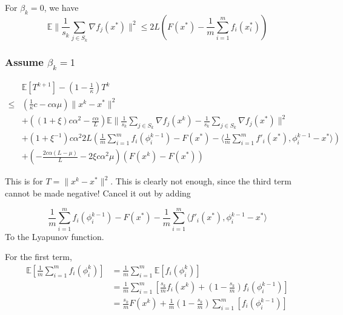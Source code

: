 \documentclass[12pt]{article}
\begin{document}
		For $\beta_k=0$, we have 
		\begin{equation}
			\mathbb{E} \| \frac{1 }{s_k} \sum_{j \in S_k}  \nabla f_j(x^*) \|^2 \leq 2L(  F(x^*)  -\frac{1}{m}\sum_{i =1}^{m}  f_i(x_i^*))
		\end{equation}
		
		\subsubsection{Assume $\beta_k=1$}
		
				\begin{align*}
					&\mathbb{E}\left[ T^{k+1} \right] - \left(1-\frac{1}{\kappa} \right) T^k \\
					\leq  &( \frac{1}{\kappa}c-c \alpha \mu)\|x^k - x^* \|^2 \\
			&+ ((1+\xi)c \alpha^2 - \frac{c \alpha }{L})\mathbb{E} \| \frac{1}{s_k} \sum_{j \in S_k}   \nabla f_j(x^k) -\frac{1}{s_k} \sum_{j \in S_k}   \nabla f_j(x^*) \|^2\\
			&+(1+\xi^{-1})c \alpha^2 2L(\frac{1}{m}\sum_{i =1}^{m}  f_i(\phi_i^{k-1})   - F(x^*)  -  \langle \frac{1 }{m} \sum_{i =1}^{m}   f'_i(x^*), \phi_i^{k-1} - x^*\rangle)\\
		&+( -\frac{2c \alpha(L - \mu)}{L}- 2 \xi c \alpha^2 \mu) (F(x^k) - F(x^*))
					\end{align*}
		
		
		This is for $T = \|x^k-x^*\|^2$. This is clearly not enough, since the third term cannot be made negative! Cancel it out by adding
		
		\begin{equation}
			 \frac{1}{m} \sum_{i =1}^{m} f_i(\phi_i^{k-1}) - F(x^*) - \frac{1}{m}  \sum_{i =1}^{m} \langle f'_i(x^*), \phi_i^{k-1} - x^*\rangle 
		\end{equation}
		To the Lyapunov function. 

		For the first term,
		\begin{align*}
		\mathbb{E} \left[ \frac{1}{m} \sum_{i =1}^{m} f_i(\phi_i^{k}) \right] & =\frac{1}{m} \sum_{i =1}^{m} \mathbb{E} \left[ f_i(\phi_i^{k}) \right] \\
		& = \frac{1}{m} \sum_{i =1}^{m} \left[ \frac{s_k}{m}  f_i(x^k) + \left(1 - \frac{s_k}{m} \right ) f_i(\phi_i^{k-1}) \right]\\
		& = \frac{s_k}{m}  F(x^k) +\frac{1}{m}  \left(1 - \frac{s_k}{m} \right )\sum_{i =1}^{m} \left[  f_i(\phi_i^{k-1}) \right]\\
		\end{align*}
\end{document}
